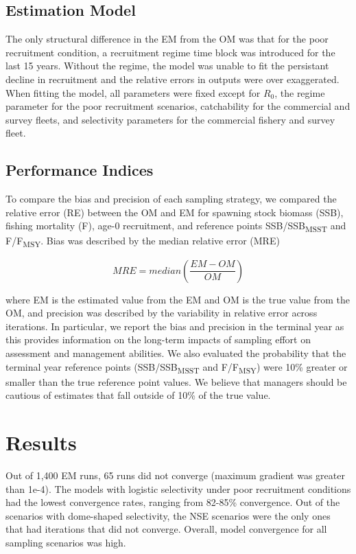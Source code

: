 \documentclass[
  letterpaper,
  12pt,
  letterpaper]{report}
\begin{document}
\section{Estimation Model}\label{estimation-model}

The only structural difference in the EM from the OM was that for the
poor recruitment condition, a recruitment regime time block was
introduced for the last 15 years. Without the regime, the model was
unable to fit the persistant decline in recruitment and the relative
errors in outputs were over exaggerated. When fitting the model, all
parameters were fixed except for \(R_0\), the regime parameter for the
poor recruitment scenarios, catchability for the commercial and survey
fleets, and selectivity parameters for the commercial fishery and survey
fleet.

\section{Performance Indices}\label{performance-indices}

To compare the bias and precision of each sampling strategy, we compared
the relative error (RE) between the OM and EM for spawning stock biomass
(SSB), fishing mortality (F), age-0 recruitment, and reference points
SSB/SSB\textsubscript{MSST} and F/F\textsubscript{MSY}. Bias was
described by the median relative error (MRE)

\[
MRE = median(\frac{EM - OM}{OM})
\]

where EM is the estimated value from the EM and OM is the true value
from the OM, and precision was described by the variability in relative
error across iterations. In particular, we report the bias and precision
in the terminal year as this provides information on the long-term
impacts of sampling effort on assessment and management abilities. We
also evaluated the probability that the terminal year reference points
(SSB/SSB\textsubscript{MSST} and F/F\textsubscript{MSY}) were 10\%
greater or smaller than the true reference point values. We believe that
managers should be cautious of estimates that fall outside of 10\% of
the true value.


\chapter{Results}\label{results}

Out of 1,400 EM runs, 65 runs did not converge (maximum gradient was
greater than 1e-4). The models with logistic selectivity under poor
recruitment conditions had the lowest convergence rates, ranging from
82-85\% convergence. Out of the scenarios with dome-shaped selectivity,
the NSE scenarios were the only ones that had iterations that did not
converge. Overall, model convergence for all sampling scenarios was
high.
\end{document}
